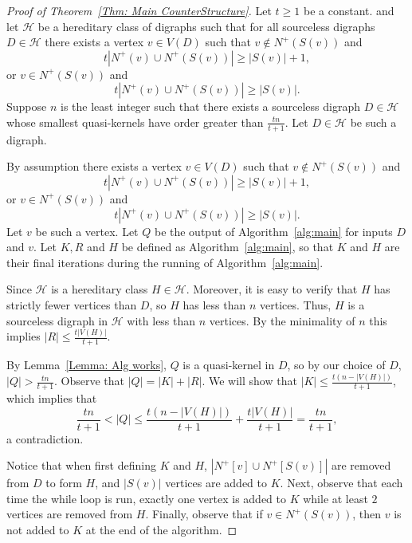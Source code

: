 \documentclass[12pt]{article}
\theoremstyle{definition}
\begin{document}
\begin{proof}[Proof of Theorem~\ref{Thm: Main CounterStructure}]
Let $t\geq 1$ be a constant.
and let $\mathcal{H}$ be a hereditary class of digraphs such that for all sourceless digraphs $D \in \mathcal{H}$
there exists a vertex $v \in V(D)$ such that $v \notin N^+(S(v))$ and
\[
t|N^+(v) \cup N^+(S(v))| \geq |S(v)|+1,
\]
or  $v \in N^+(S(v))$ and
\[
t|N^+(v) \cup N^+(S(v))| \geq |S(v)|.
\]
Suppose 
$n$ is the least integer such that there exists a sourceless digraph
$D \in \mathcal{H}$ 
whose smallest quasi-kernels have order greater than $\frac{tn}{t+1}$.
Let $D \in \mathcal{H}$ be such a digraph.

By assumption there exists a vertex
$v \in V(D)$ such that $v \notin N^+(S(v))$ and
\[
t|N^+(v) \cup N^+(S(v))| \geq |S(v)|+1,
\]
or  $v \in N^+(S(v))$ and
\[
t|N^+(v) \cup N^+(S(v))| \geq |S(v)|.
\]
Let $v$ be such a vertex.
Let $Q$ be the output of Algorithm~\ref{alg:main} for inputs $D$ and $v$.
Let $K,R$ and $H$ be defined as Algorithm~\ref{alg:main},
so that $K$ and $H$ are their final iterations during the running of Algorithm~\ref{alg:main}.

Since $\mathcal{H}$ is a hereditary class $H \in \mathcal{H}$.
Moreover, it is easy to verify that $H$ has strictly fewer vertices than $D$, so $H$ has less than $n$ vertices.
Thus, $H$ is a sourceless digraph in $\mathcal{H}$ with less than $n$ vertices.
By the minimality of $n$ this implies $|R| \leq \frac{t|V(H)|}{t+1}$.

By Lemma~\ref{Lemma: Alg works}, $Q$ is a quasi-kernel in $D$, so by our choice of $D$, $|Q| > \frac{tn}{t+1}$.
Observe that $|Q| = |K| + |R|$.
We will show that $|K| \leq \frac{t(n-|V(H)|)}{t+1}$, which implies that 
\[
\frac{tn}{t+1} < |Q| \leq \frac{t(n-|V(H)|)}{t+1} + \frac{t|V(H)|}{t+1} = \frac{tn}{t+1},
\]
a contradiction.

Notice that when first defining $K$ and $H$, 
$|N^+[v] \cup N^+[S(v)]|$ are removed from $D$ to form $H$,
and $|S(v)|$ vertices are added to $K$.
Next, observe that each time the while loop is run, 
exactly one vertex is added to $K$ 
while at least $2$ vertices are removed from $H$.
Finally, observe that if $v \in N^+(S(v))$, then $v$ is not added to $K$ at the end of the algorithm.


\end{proof}
\end{document}
